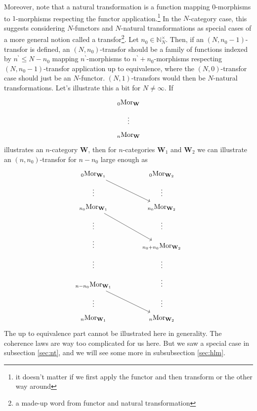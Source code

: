 Moreover, note that a natural transformation is a function mapping $0$-morphisms to $1$-morphisms respecting the functor application.\footnote{it doesn't matter if we first apply the functor and then transform or the other way around}
In the $N$-category case, this suggests considering $N$-functors and $N$-natural transformations as special cases of a more general notion called a transfor\footnote{a made-up word from functor and natural transformation}.
Let $n_{0} \in \mathbb{N}_{N}^{\times}$.
Then, if an $(N,n_{0}-1)$-transfor is defined, an $(N,n_{0})$-transfor should be a family of functions indexed by $n^{\backprime} \leq N - n_{0}$ mapping $n^{\backprime}$-morphisms to $n^{\backprime}+n_{0}$-morphisms respecting $(N,n_{0}-1)$-transfor application up to equivalence, where the $(N,0)$-transfor case should just be an $N$-functor.
$(N,1)$-transfors would then be $N$-natural transformations.
Let's illustrate this a bit for $N \neq \infty$.
If
\[
\begin{tikzcd}[sep=tiny]
  {}_{0}\mathrm{Mor}_{\mathbf{W}}
  \\
  \vdots
  \\
  {}_{n}\mathrm{Mor}_{\mathbf{W}}
\end{tikzcd}
\]
illustrates an $n$-category $\mathbf{W}$, then for $n$-categories $\mathbf{W}_{1}$ and $\mathbf{W}_{2}$ we can illustrate an $(n,n_{0})$-transfor for $n-n_{0}$ large enough as
\[
\begin{tikzcd}[row sep=tiny,column sep=large]
  {}_{0}\mathrm{Mor}_{\mathbf{W}_{1}}
  \arrow{rdd}{}
  &
  {}_{0}\mathrm{Mor}_{\mathbf{W}_{2}}
  \\
  \vdots
  &
  \vdots
  \\
  {}_{n_{0}}\mathrm{Mor}_{\mathbf{W}_{1}}
  \arrow{rdd}{}
  &
  {}_{n_{0}}\mathrm{Mor}_{\mathbf{W}_{2}}
  \\
  \vdots
  &
  \vdots
  \\
  \vdots
  &
  {}_{n_{0}+n_{0}}\mathrm{Mor}_{\mathbf{W}_{2}}
  \\
  \vdots
  &
  \vdots
  \\
  {}_{n-n_{0}}\mathrm{Mor}_{\mathbf{W}_{1}}
  \arrow{rdd}{}
  &
  \vdots
  \\
  \vdots
  &
  \vdots
  \\
  {}_{n}\mathrm{Mor}_{\mathbf{W}_{1}}
  &
  {}_{n}\mathrm{Mor}_{\mathbf{W}_{2}}
\end{tikzcd}
\]
The up to equivalence part cannot be illustrated here in generality.
The coherence laws are way too complicated for us here.
But we saw a special case in subsection \ref{sec:nt}, and we will see some more in subsubsection \ref{sec:hlm}.
